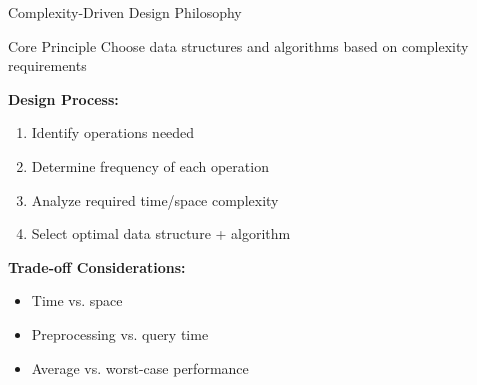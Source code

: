 \documentclass[aspectratio=169,xcolor=dvipsnames]{beamer}
\begin{document}
\begin{frame}{Complexity-Driven Design Philosophy}
  \begin{block}{Core Principle}
    Choose data structures and algorithms based on complexity requirements
  \end{block}

  \vspace{0.3cm}
  \textbf{Design Process:}
  \begin{enumerate}
    \item Identify operations needed
    \item Determine frequency of each operation
    \item Analyze required time/space complexity
    \item Select optimal data structure + algorithm
  \end{enumerate}

  \vspace{0.3cm}
  \textbf{Trade-off Considerations:}
  \begin{itemize}
    \item Time vs. space
    \item Preprocessing vs. query time
    \item Average vs. worst-case performance
  \end{itemize}
\end{frame}
\end{document}
